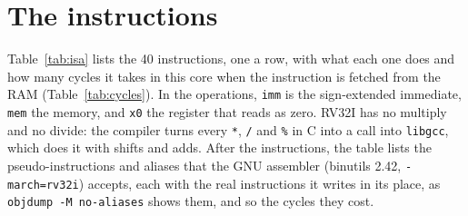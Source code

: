 \documentclass[11pt,a4paper]{report}
\begin{document}
\section{The instructions}
\label{sec:isa-instructions}

Table~\ref{tab:isa} lists the 40 instructions, one a row, with what each one does and how many
cycles it takes in this core when the instruction is fetched from the RAM
(Table~\ref{tab:cycles}). In the operations, \texttt{imm} is the sign-extended immediate,
\texttt{mem} the memory, and \texttt{x0} the register that reads as zero. RV32I has no
multiply and no divide: the compiler turns every \texttt{*}, \texttt{/} and \texttt{\%} in C
into a call into \texttt{libgcc}, which does it with shifts and adds. After the instructions,
the table lists the pseudo-instructions and aliases that the GNU assembler (binutils 2.42,
\texttt{-march=rv32i}) accepts, each with the real instructions it writes in its place, as
\texttt{objdump -M no-aliases} shows them, and so the cycles they cost.
\end{document}
